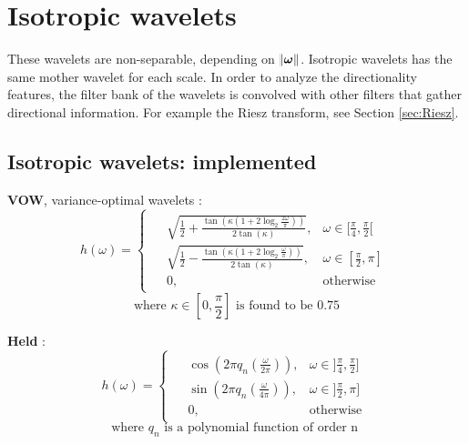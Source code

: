 \documentclass{InsightArticle}
\theoremstyle{definition}
\begin{document}
\section{Isotropic wavelets}
\label{sub:Isotropic}
These wavelets are non-separable, depending on $\norm{\bm{\omega}}$. Isotropic wavelets has the same mother wavelet for each scale. In order to analyze the directionality features, the filter bank of the wavelets is convolved with other filters that gather directional information. For example the Riesz transform, see Section \ref{sec:Riesz}.

\subsection{Isotropic wavelets: implemented}
\noindent\begin{minipage}[t]{0.49\textwidth}
  \textbf{VOW}, variance-optimal wavelets \cite{pad_vow:_2014} :
\begin{equation*}
\label{VOW}
  h(\omega) =
    \begin{cases}
    \begin{aligned}
      &\sqrt{\frac{1}{2} + \frac{\tan(\kappa(1+2\log_2\frac{2\omega}{\pi}))}{2\tan(\kappa)}} , &\omega \in [\frac{\pi}{4} , \frac{\pi}{2} [ \\
      &\sqrt{\frac{1}{2} - \frac{\tan(\kappa(1+2\log_2\frac{\omega}{\pi}))}{2\tan(\kappa)}} , &\omega \in [\frac{\pi}{2} , \pi ] \\
      &0, &\text{otherwise}
    \end{aligned}
    \end{cases}
\end{equation*}
\begin{equation*}
  \text{where } \kappa \in [0, \frac{\pi}{2}] \text{ is found to be } 0.75
\end{equation*}
\newline
\end{minipage}
\noindent\begin{minipage}[t]{0.49\textwidth}
  \textbf{Held} \cite{held_steerable_2010} :
\begin{equation*}
\label{Held}
  h(\omega) =
    \begin{cases}
    \begin{aligned}
&\cos\left(2\pi q_n(\frac{\omega}{2\pi})\right) , &\omega \in ]\frac{\pi}{4} , \frac{\pi}{2} ] \\
  &\sin\left(2\pi q_n(\frac{\omega}{4\pi})\right) , &\omega \in ]\frac{\pi}{2} , \pi ] \\
      &0, &\text{otherwise}
    \end{aligned}
    \end{cases}
\end{equation*}
\begin{equation*}
  \text{where } q_n \text{ is a polynomial function of order n } %
\end{equation*}
\end{minipage}
\end{document}
